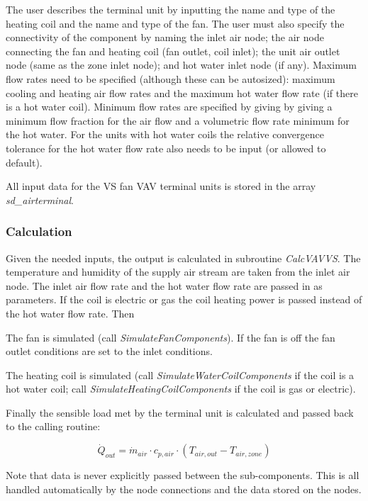 The user describes the terminal unit by inputting the name and type of the heating coil and the name and type of the fan. The user must also specify the connectivity of the component by naming the inlet air node; the air node connecting the fan and heating coil (fan outlet, coil inlet); the unit air outlet node (same as the zone inlet node); and hot water inlet node (if any). Maximum flow rates need to be specified (although these can be autosized): maximum cooling and heating air flow rates and the maximum hot water flow rate (if there is a hot water coil). Minimum flow rates are specified by giving by giving a minimum flow fraction for the air flow and a volumetric flow rate minimum for the hot water. For the units with hot water coils the relative convergence tolerance for the hot water flow rate also needs to be input (or allowed to default).

All input data for the VS fan VAV terminal units is stored in the array \textit{sd\_airterminal}.

\subsubsection{Calculation}\label{calculation-2}

Given the needed inputs, the output is calculated in subroutine \emph{CalcVAVVS}. The temperature and humidity of the supply air stream are taken from the inlet air node. The inlet air flow rate and the hot water flow rate are passed in as parameters. If the coil is electric or gas the coil heating power is passed instead of the hot water flow rate. Then

The fan is simulated (call \emph{SimulateFanComponents}). If the fan is off the fan outlet conditions are set to the inlet conditions.

The heating coil is simulated (call \emph{SimulateWaterCoilComponents} if the coil is a hot water coil; call \emph{SimulateHeatingCoilComponents} if the coil is gas or electric).

Finally the sensible load met by the terminal unit is calculated and passed back to the calling routine:

\begin{equation}
{\dot Q_{out}} = {\dot m_{air}}\cdot {c_{p,air}}\cdot ({T_{air,out}} - {T_{air,zone}})
\end{equation}

Note that data is never explicitly passed between the sub-components. This is all handled automatically by the node connections and the data stored on the nodes.

